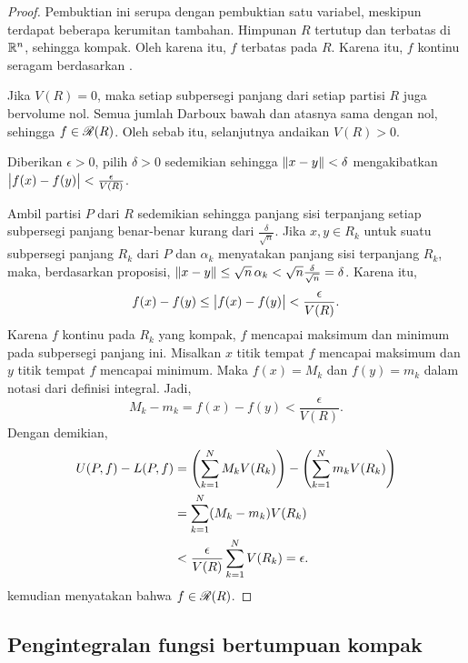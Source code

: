 \begin{proof}
Pembuktian ini serupa dengan pembuktian satu variabel, meskipun terdapat
beberapa kerumitan tambahan. Himpunan $R$ tertutup dan terbatas di ${\mathbb{R}}^n$,
sehingga kompak. Oleh karena itu, $f$ terbatas pada $R$.
Karena itu, $f$ kontinu seragam berdasarkan
.

Jika $V(R)=0$, maka setiap subpersegi panjang dari setiap partisi $R$ juga
bervolume nol. Semua jumlah Darboux bawah dan atasnya sama dengan nol, sehingga
$f\in{\mathscr{R}}(R)$. Oleh sebab itu, selanjutnya andaikan $V(R)>0$.

Diberikan $\epsilon > 0$, pilih $\delta > 0$ sedemikian sehingga
$\lVert {x-y} \rVert < \delta$ mengakibatkan
$\bigl\lvert {f(x)-f(y)} \bigr\rvert < \frac{\epsilon}{V(R)}$.

Ambil partisi $P$ dari $R$ sedemikian sehingga panjang sisi terpanjang setiap
subpersegi panjang benar-benar kurang dari $\frac{\delta}{\sqrt{n}}$.
Jika $x,y \in R_k$ untuk suatu subpersegi panjang $R_k$ dari $P$ dan $\alpha_k$
menyatakan panjang sisi terpanjang $R_k$, maka, berdasarkan proposisi,
$\lVert {x-y} \rVert \leq \sqrt{n}\,\alpha_k <
\sqrt{n}\frac{\delta}{\sqrt{n}} = \delta$. Karena itu,
\begin{equation*}
f(x)-f(y) \leq \bigl\lvert {f(x)-f(y)} \bigr\rvert < \frac{\epsilon}{V(R)} .
\end{equation*}
Karena $f$ kontinu pada $R_k$ yang kompak, $f$ mencapai maksimum dan minimum
pada subpersegi panjang ini. Misalkan $x$ titik tempat $f$ mencapai maksimum
dan $y$ titik tempat $f$ mencapai minimum. Maka $f(x) = M_k$ dan
$f(y) = m_k$ dalam notasi dari definisi integral. Jadi,
\begin{equation*}
M_k-m_k = f(x)-f(y) < 
\frac{\epsilon}{V(R)} .
\end{equation*}
Dengan demikian,
\begin{equation*}
\begin{split}
U(P,f) - L(P,f)
& =
\left(
\sum_{k=1}^N
M_k V(R_k)
\right)
-
\left(
\sum_{k=1}^N
m_k V(R_k)
\right)
\\
& =
\sum_{k=1}^N
(M_k-m_k) V(R_k)
\\
& <
\frac{\epsilon}{V(R)}
\sum_{k=1}^N
V(R_k)
= \epsilon.
\end{split}
\avoidbreak
\end{equation*}
 kemudian menyatakan bahwa $f \in {\mathscr{R}}(R)$.
\end{proof}

\subsection{Pengintegralan fungsi bertumpuan kompak}

